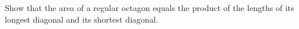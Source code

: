 Show that the area of a regular octagon equals the product of the lengths of its longest diagonal and its shortest diagonal.
